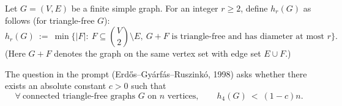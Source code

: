 Let $G=(V,E)$ be a finite simple graph. For an integer $r\ge 2$, define $h_r(G)$ as follows (for triangle-free $G$):
\[
 h_r(G)\ :=\ \min\bigl\{|F|:\ F\subseteq \binom{V}{2}\setminus E,\ \text{$G+F$ is triangle-free and has diameter at most $r$}\bigr\}.
\]
(Here $G+F$ denotes the graph on the same vertex set with edge set $E\cup F$.)

The question in the prompt (Erd\H{o}s--Gy\'arf\'as--Ruszink\'o, 1998) asks whether there exists an absolute constant $c>0$ such that
\[
\forall\ \text{connected triangle-free graphs $G$ on $n$ vertices},\qquad h_4(G)\ <\ (1-c)n.
\]
